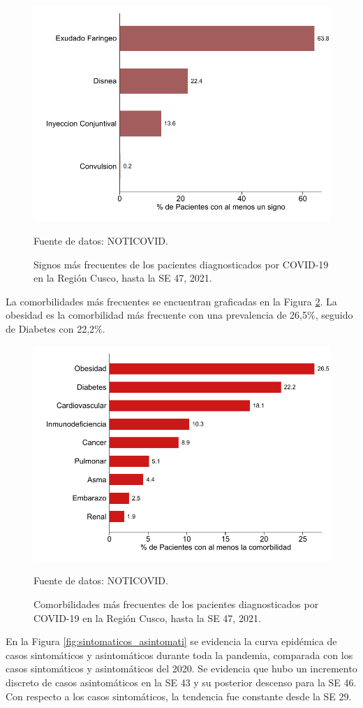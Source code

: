 \documentclass[12pt,a4paper,openany]{book}
\begin{document}
\begin{figure}[h]
	\caption{Signos más frecuentes de los pacientes diagnosticados por COVID-19 en la Región Cusco, hasta la SE 47, 2021.}\label{fig:signos}
	\begin{center}
		\includegraphics[width=0.65\linewidth]{../figuras/figura_signo.pdf}
	\end{center}
	{\footnotesize {Fuente de datos: NOTICOVID.}}
\end{figure}

La comorbilidades más frecuentes se encuentran graficadas en la Figura \ref{fig:comorbilidades}. La obesidad es la comorbilidad más frecuente con una prevalencia de 26,5$\%$, seguido de Diabetes con 22,2$\%$. 

\begin{figure}[h]
	\caption{Comorbilidades más frecuentes de los pacientes diagnosticados por COVID-19 en la Región Cusco, hasta la SE 47, 2021. }\label{fig:comorbilidades}
	\begin{center}
		\includegraphics[width=0.65\linewidth]{../figuras/figura_comorbilidad.pdf}
	\end{center}
	{\footnotesize {Fuente de datos: NOTICOVID.}}
\end{figure}
\clearpage
 En la Figura \ref{fig:sintomaticos_asintomati} se evidencia la curva epidémica de casos sintomáticos y asintomáticos durante toda la pandemia, comparada con los casos sintomáticos y asintomáticos del 2020. Se evidencia que hubo un incremento discreto de casos asintomáticos en la SE 43 y su posterior descenso para la SE 46. Con respecto a los casos sintomáticos, la tendencia fue constante desde la SE 29.  
 
\end{document}
